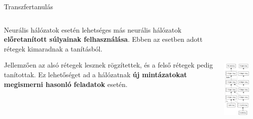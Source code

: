 \documentclass[english, aspectratio=169]{beamer}
\begin{document}
\begin{frame}{Transzfertanulás}
\begin{columns}
\begin{column}{.5\textwidth}
Neurális hálózatok esetén lehetséges más neurális hálózatok \textbf{előretanított súlyainak felhasználása}. Ebben az esetben adott rétegek kimaradnak a tanításból.\par\smallskip
Jellemzően az alsó rétegek lesznek rögzítettek, és a felső rétegek pedig tanítottak. Ez lehetőséget ad a hálózatnak \textbf{új mintázatokat megismerni hasonló feladatok} esetén.
\end{column}
\begin{column}{.5\textwidth}
\begin{center}
\includegraphics[height=7cm, keepaspectratio]{graphs/dl_3.png}
\end{center}
\end{column}
\end{columns}
\end{frame}
\end{document}
